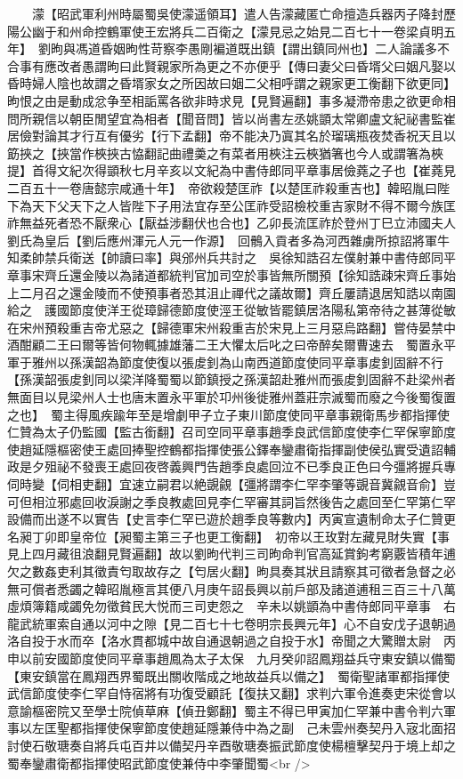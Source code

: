 　　濛【昭武軍利州時屬蜀吳使濛遥領耳】遣人告濛藏匿亡命擅造兵器丙子降封歷陽公幽于和州命控鶴軍使王宏將兵二百衛之【濛見忌之始見二百七十一卷梁貞明五年】　劉昫與馮道昏姻昫性苛察李愚剛褊道既出鎮【謂出鎮同州也】二人論議多不合事有應改者愚謂昫曰此賢親家所為更之不亦便乎【傳曰妻父曰昏壻父曰姻凡娶以昏時婦人陰也故謂之昏壻家女之所因故曰姻二父相呼謂之親家更工衡翻下欲更同】昫恨之由是動成忿争至相詬罵各欲非時求見【見賢遍翻】事多凝滯帝患之欲更命相問所親信以朝臣閒望宜為相者【聞音問】皆以尚書左丞姚顗太常卿盧文紀祕書監崔居儉對論其才行互有優劣【行下孟翻】帝不能决乃寘其名於瑠璃瓶夜焚香祝天且以筯挾之【挾當作梜挾古恊翻記曲禮羮之有菜者用梜注云梜猶箸也今人或謂箸為梜提】首得文紀次得顗秋七月辛亥以文紀為中書侍郎同平章事居儉蕘之子也【崔蕘見二百五十一卷唐懿宗咸通十年】　帝欲殺楚匡祚【以楚匡祚殺重吉也】韓昭胤曰陛下為天下父天下之人皆陛下子用法宜存至公匡祚受詔檢校重吉家財不得不爾今族匡祚無益死者恐不厭衆心【厭益涉翻伏也合也】乙卯長流匡祚於登州丁巳立沛國夫人劉氏為皇后【劉后應州渾元人元一作源】　回鶻入貢者多為河西雜虜所掠詔將軍牛知柔帥禁兵衛送【帥讀曰率】與邠州兵共討之　吳徐知誥召左僕射兼中書侍郎同平章事宋齊丘還金陵以為諸道都統判官加司空於事皆無所關預【徐知誥疎宋齊丘事始上二月召之還金陵而不使預事者恐其沮止禪代之議故爾】齊丘屢請退居知誥以南園給之　護國節度使洋王從璋歸德節度使涇王從敏皆罷鎮居洛陽私第帝待之甚薄從敏在宋州預殺重吉帝尤惡之【歸德軍宋州殺重吉於宋見上三月惡烏路翻】嘗侍晏禁中酒酣顧二王曰爾等皆何物輒據雄藩二王大懼太后叱之曰帝醉矣爾曹速去　蜀置永平軍于雅州以孫漢韶為節度使復以張䖍釗為山南西道節度使同平章事䖍釗固辭不行【孫漢韶張䖍釗同以梁洋降蜀蜀以節鎮授之孫漢韶赴雅州而張䖍釗固辭不赴梁州者無面目以見梁州人士也唐末置永平軍於卭州後徙雅州蓋莊宗滅蜀而廢之今後蜀復置之也】　蜀主得風疾踰年至是增劇甲子立子東川節度使同平章事親衛馬步都指揮使仁贊為太子仍監國【監古銜翻】召司空同平章事趙季良武信節度使李仁罕保寧節度使趙延隱樞密使王處回捧聖控鶴都指揮使張公鐸奉鑾肅衛指揮副使侯弘實受遺詔輔政是夕殂祕不發喪王處回夜啓義興門告趙季良處回泣不已季良正色曰今彊將握兵專伺時變【伺相吏翻】宜速立嗣君以絶覬覦【彊將謂李仁罕李肇等覬音冀覦音俞】豈可但相泣邪處回收淚謝之季良教處回見李仁罕審其詞旨然後告之處回至仁罕第仁罕設備而出遂不以實告【史言李仁罕已遊於趙季良等數内】丙寅宣遺制命太子仁贊更名昶丁卯即皇帝位【昶蜀主第三子也更工衡翻】　初帝以王玫對左藏見財失實【事見上四月藏徂浪翻見賢遍翻】故以劉昫代判三司昫命判官高延賞鉤考窮覈皆積年逋欠之數姦吏利其徵責匄取故存之【匄居火翻】昫具奏其狀且請察其可徵者急督之必無可償者悉蠲之韓昭胤極言其便八月庚午詔長興以前戶部及諸道逋租三百三十八萬虛煩簿籍咸蠲免勿徵貧民大悦而三司吏怨之　辛未以姚顗為中書侍郎同平章事　右龍武統軍索自通以河中之隙【見二百七十七卷明宗長興元年】心不自安戊子退朝過洛自投于水而卒【洛水貫都城中故自通退朝過之自投于水】帝聞之大驚贈太尉　丙申以前安國節度使同平章事趙鳳為太子太保　九月癸卯詔鳳翔益兵守東安鎮以備蜀【東安鎮當在鳳翔西界蜀既出關收階成之地故益兵以備之】　蜀衛聖諸軍都指揮使武信節度使李仁罕自恃宿將有功復受顧託【復扶又翻】求判六軍令進奏吏宋從會以意諭樞密院又至學士院偵草麻【偵丑鄭翻】蜀主不得已甲寅加仁罕兼中書令判六軍事以左匡聖都指揮使保寧節度使趙延隱兼侍中為之副　己未雲州奏契丹入宼北面招討使石敬瑭奏自將兵屯百井以備契丹辛酉敬瑭奏振武節度使楊檀擊契丹于境上却之蜀奉鑾肅衛都指揮使昭武節度使兼侍中李肇聞蜀<br />
